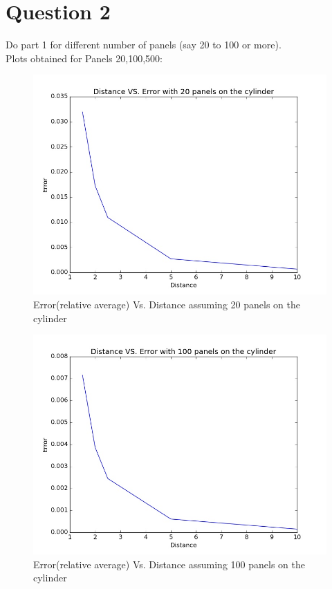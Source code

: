 \documentclass{article}
\begin{document}
\newpage
\section*{Question 2}
Do part 1 for different number of panels (say 20 to 100 or more).
\\
Plots obtained for Panels 20,100,500:
\begin{figure}[H] \label{figure}
\includegraphics[width=12cm]{result2.jpg}
\caption{Error(relative average) Vs. Distance assuming 20 panels on the cylinder}
\label{figure:}
\end{figure}

\begin{figure}[H]  \label{figure}
\includegraphics[width=12cm]{result3.jpg}
\caption{Error(relative average) Vs. Distance assuming 100 panels on the cylinder}
\label{figure:}
\end{figure}
\end{document}
